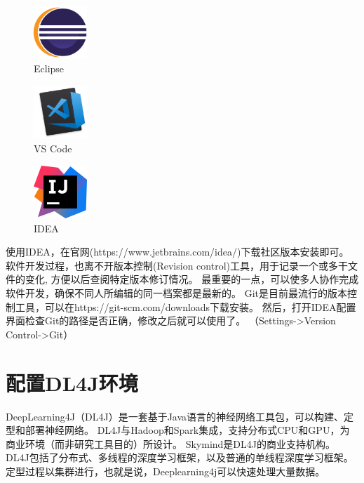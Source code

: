 \begin{figure}[!htb]
	\centering
	\begin{minipage}{0.2\textwidth}
		\includegraphics[width=2cm]{images/logo_eclipse.png} \\
		\centering Eclipse
	\end{minipage}
	\begin{minipage}{0.2\textwidth}
		\includegraphics[width=2cm]{images/logo_vscode.png} \\
		\centering VS Code
	\end{minipage}
	\begin{minipage}{0.2\textwidth}
		\includegraphics[width=2cm]{images/logo_idea.png} \\
		\centering IDEA
	\end{minipage}
\end{figure}

\noindent
使用IDEA，在官网(https://www.jetbrains.com/idea/)下载社区版本安装即可。
软件开发过程，也离不开版本控制(Revision control)工具，用于记录一个或多干文件的变化,
方便以后查阅特定版本修订情况。
最重要的一点，可以使多人协作完成软件开发，确保不同人所编辑的同一档案都是最新的。
Git是目前最流行的版本控制工具，可以在https://git-scm.com/downloads下载安装。
然后，打开IDEA配置界面检查Git的路径是否正确，修改之后就可以使用了。
（Settings->Version Control->Git）

\section{配置DL4J环境}
DeepLearning4J（DL4J）是一套基于Java语言的神经网络工具包，可以构建、定型和部署神经网络。
DL4J与Hadoop和Spark集成，支持分布式CPU和GPU，为商业环境（而非研究工具目的）所设计。
Skymind是DL4J的商业支持机构。
DL4J包括了分布式、多线程的深度学习框架，以及普通的单线程深度学习框架。
定型过程以集群进行，也就是说，Deeplearning4j可以快速处理大量数据。

